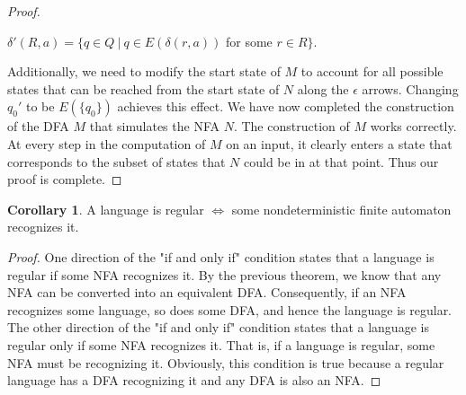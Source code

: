 \documentclass[11pt]{article}
\theoremstyle{definition}
\newtheorem{cor}{Corollary}[thm]
\begin{document}
\begin{proof}
    \begin{center}
        $\delta'(R,a) = \{q\in Q\ |\ q\in E(\delta(r,a))$ for some $r\in R\}$.
    \end{center}
    Additionally, we need to modify the start state of $M$ to account for all possible states that can be reached from the start state of $N$ along the $\epsilon$ arrows. Changing $q_0'$ to be $E(\{q_0\})$ achieves this effect. We have now completed the construction of the DFA $M$ that simulates the NFA $N$.
    The construction of $M$ works correctly. At every step in the computation of $M$ on an input, it clearly enters a state that corresponds to the subset of states that $N$ could be in at that point. Thus our proof is complete.
\end{proof}
\begin{cor}
    A language is regular $\iff$ some nondeterministic finite automaton recognizes it.
\end{cor}
\begin{proof}
One direction of the "if and only if" condition states that a language is regular if some NFA recognizes it. By the previous theorem, we know that any NFA can be converted into an equivalent DFA. Consequently, if an NFA recognizes some language, so does some DFA, and hence the language is regular. The other direction of the "if and only if" condition states that a language is regular only if some NFA recognizes it. That is, if a language is regular, some NFA must be recognizing it. Obviously, this condition is true because a regular language has a DFA recognizing it and any DFA is also an NFA.
\end{proof}
\end{document}
